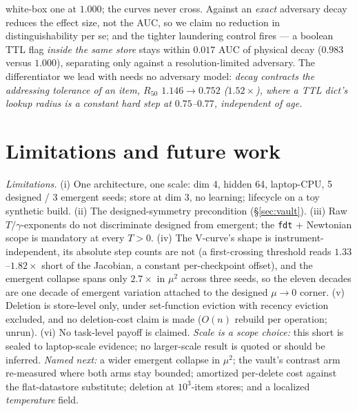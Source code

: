 white-box one at $1.000$; the curves never cross. Against an \emph{exact} adversary decay reduces the effect size, not the AUC, so we claim no reduction in distinguishability per se; and the tighter laundering control fires --- a boolean TTL flag \emph{inside the same store} stays within $0.017$ AUC of physical decay ($0.983$ versus $1.000$), separating only against a resolution-limited adversary. The differentiator we lead with needs no adversary model: \emph{decay contracts the addressing tolerance of an item, $R_{50}$ $1.146\to0.752$ ($1.52\times$), where a TTL dict's lookup radius is a constant hard step at $0.75$--$0.77$, independent of age.}

\section{Limitations and future work}\label{sec:limits}

{\footnotesize\emph{Limitations.} (i) One architecture, one scale: dim 4, hidden 64, laptop-CPU, 5 designed / 3 emergent seeds; store at dim 3, no learning; lifecycle on a toy synthetic build. (ii) The designed-symmetry precondition (\S\ref{sec:vault}). (iii) Raw $T/\gamma$-exponents do not discriminate designed from emergent; the \texttt{fdt} + Newtonian scope is mandatory at every $T>0$. (iv) The V-curve's shape is instrument-independent, its absolute step counts are not (a first-crossing threshold reads $1.33$--$1.82\times$ short of the Jacobian, a constant per-checkpoint offset), and the emergent collapse spans only $2.7\times$ in $\mu^2$ across three seeds, so the eleven decades are one decade of emergent variation attached to the designed $\mu\to0$ corner. (v) Deletion is store-level only, under set-function eviction with recency eviction excluded, and no deletion-cost claim is made ($O(n)$ rebuild per operation; unrun). (vi) No task-level payoff is claimed. \emph{Scale is a scope choice:} this short is sealed to laptop-scale evidence; no larger-scale result is quoted or should be inferred. \emph{Named next:} a wider emergent collapse in $\mu^2$; the vault's contrast arm re-measured where both arms stay bounded; amortized per-delete cost against the flat-datastore substitute; deletion at $10^3$-item stores; and a localized \emph{temperature} field.\par}
